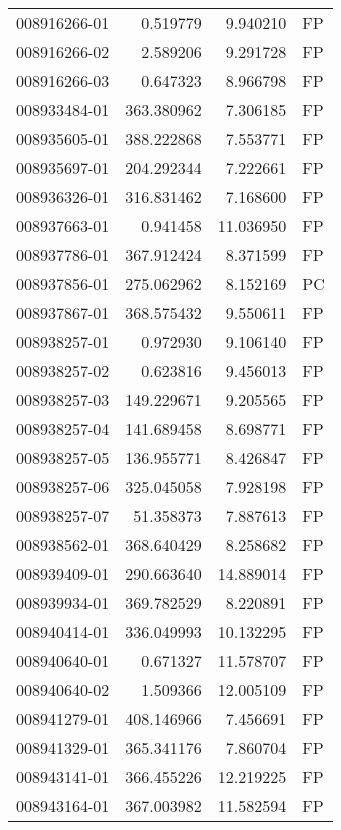 \begin{tabular}{lrrl}
008916266-01 &    0.519779 &       9.940210 &   FP \\
008916266-02 &    2.589206 &       9.291728 &   FP \\
008916266-03 &    0.647323 &       8.966798 &   FP \\
008933484-01 &  363.380962 &       7.306185 &   FP \\
008935605-01 &  388.222868 &       7.553771 &   FP \\
008935697-01 &  204.292344 &       7.222661 &   FP \\
008936326-01 &  316.831462 &       7.168600 &   FP \\
008937663-01 &    0.941458 &      11.036950 &   FP \\
008937786-01 &  367.912424 &       8.371599 &   FP \\
008937856-01 &  275.062962 &       8.152169 &   PC \\
008937867-01 &  368.575432 &       9.550611 &   FP \\
008938257-01 &    0.972930 &       9.106140 &   FP \\
008938257-02 &    0.623816 &       9.456013 &   FP \\
008938257-03 &  149.229671 &       9.205565 &   FP \\
008938257-04 &  141.689458 &       8.698771 &   FP \\
008938257-05 &  136.955771 &       8.426847 &   FP \\
008938257-06 &  325.045058 &       7.928198 &   FP \\
008938257-07 &   51.358373 &       7.887613 &   FP \\
008938562-01 &  368.640429 &       8.258682 &   FP \\
008939409-01 &  290.663640 &      14.889014 &   FP \\
008939934-01 &  369.782529 &       8.220891 &   FP \\
008940414-01 &  336.049993 &      10.132295 &   FP \\
008940640-01 &    0.671327 &      11.578707 &   FP \\
008940640-02 &    1.509366 &      12.005109 &   FP \\
008941279-01 &  408.146966 &       7.456691 &   FP \\
008941329-01 &  365.341176 &       7.860704 &   FP \\
008943141-01 &  366.455226 &      12.219225 &   FP \\
008943164-01 &  367.003982 &      11.582594 &   FP \\

\end{tabular}
